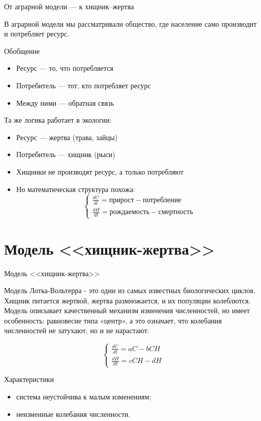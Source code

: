 \documentclass[12pt]{beamer}
\begin{document}
\begin{frame}{От аграрной модели — к хищник–жертва}

В аграрной модели мы рассматривали общество, где население само производит и потребляет ресурс.

\begin{exampleblock}{Обобщение}
\begin{itemize}
    \item Ресурс — то, что потребляется
    \item Потребитель — тот, кто потребляет ресурс
    \item Между ними — обратная связь
\end{itemize}
\end{exampleblock}

Та же логика работает в экологии:

\begin{itemize}
    \item Ресурс — жертва (трава, зайцы)
    \item Потребитель — хищник (рыси)
    \item Хищники не производят ресурс, а только потребляют
    \item Но математическая структура похожа: 
    \[
    \begin{cases}
    \frac{dC}{dt} = \text{прирост} - \text{потребление} \\
    \frac{dH}{dt} = \text{рождаемость} - \text{смертность}
    \end{cases}
    \]
\end{itemize}

\end{frame}

\section{Модель <<хищник-жертва>>}

\begin{frame}{Модель <<хищник-жертва>>}

Модель Лотка-Вольтерра - это один из самых известных биологических циклов. Хищник питается жертвой, жертва размножается, и их популяции колеблются. Модель описывает качественный механизм изменения численностей, но имеет особенность: равновесие типа «центр», а это означает, что колебания численностей не затухают, но и не нарастают.

\[
\begin{cases}
\frac{dC}{dt}=aC-bCH\\
\frac{dH}{dt}=cCH-dH
\end{cases}
\]

\begin{exampleblock}{Характеристики}
\begin{itemize}
    \item система неустойчива к малым изменениям;
    \item неизменные колебания численности.
\end{itemize}
\end{exampleblock}

\end{frame}
\end{document}
